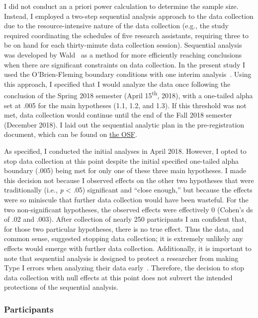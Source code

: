 \documentclass{sfuthesis}
\begin{document}
I did not conduct an a priori power calculation to determine the sample size. Instead, I employed a two-step sequential analysis approach to the data collection due to the resource-intensive nature of the data collection (e.g., the study required coordinating the schedules of five research assistants, requiring three to be on hand for each thirty-minute data collection session). Sequential analysis was developed by Wald~\cite{wald47} as a method for more efficiently reaching conclusions when there are significant constraints on data collection. In the present study I used the O’Brien-Fleming boundary conditions with one interim analysis~\cite{obrien79}. Using this approach, I specified that I would analyze the data once following the conclusion of the Spring 2018 semester (April 15\textsuperscript{th}, 2018), with a one-tailed alpha set at .005 for the main hypotheses (1.1, 1.2, and 1.3). If this threshold was not met, data collection would continue until the end of the Fall 2018 semester (December 2018). I laid out the sequential analytic plan in the pre-registration document, which can be found on \href{https://osf.io/5cugx/register/5730e99a9ad5a102c5745a8a}{the OSF}.

As specified, I conducted the initial analyses in April 2018. However, I opted to stop data collection at this point despite the initial specified one-tailed alpha boundary (.005) being met for only one of these three main hypotheses. I made this decision not because I observed effects on the other two hypotheses that were traditionally (i.e., \textit{p} < .05) significant and “close enough,” but because the effects were so miniscule that further data collection would have been wasteful. For the two non-significant hypotheses, the observed effects were effectively 0 (Cohen’s ds of .02 and .003). After collection of nearly 250 participants I am confident that, for those two particular hypotheses, there is no true effect. Thus the data, and common sense, suggested stopping data collection; it is extremely unlikely any effects would emerge with further data collection. Additionally, it is important to note that sequential analysis is designed to protect a researcher from making Type I errors when analyzing their data early~\cite{malek17, wald47}. Therefore, the decision to stop data collection with null effects at this point does not subvert the intended protections of the sequential analysis.

\subsubsection{Participants}
\end{document}
